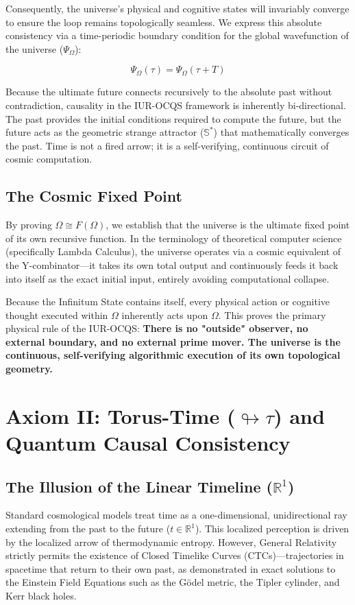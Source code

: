 \documentclass[12pt,openany]{book}
\begin{document}
Consequently, the universe's physical and cognitive states will invariably converge to ensure the loop remains topologically seamless. We express this absolute consistency via a time-periodic boundary condition for the global wavefunction of the universe ($\Psi_\Omega$):

\begin{equation}
\Psi_\Omega(\tau) = \Psi_\Omega(\tau + T)
\end{equation}

Because the ultimate future connects recursively to the absolute past without contradiction, causality in the IUR-OCQS framework is inherently bi-directional. The past provides the initial conditions required to compute the future, but the future acts as the geometric strange attractor ($\mathbb{S}^*$) that mathematically converges the past. Time is not a fired arrow; it is a self-verifying, continuous circuit of cosmic computation.

\subsection{The Cosmic Fixed Point}
By proving $\Omega \cong F(\Omega)$, we establish that the universe is the ultimate fixed point of its own recursive function. In the terminology of theoretical computer science (specifically Lambda Calculus), the universe operates via a cosmic equivalent of the Y-combinator—it takes its own total output and continuously feeds it back into itself as the exact initial input, entirely avoiding computational collapse.

Because the Infinitum State contains itself, every physical action or cognitive thought executed within $\Omega$ inherently acts upon $\Omega$. This proves the primary physical rule of the IUR-OCQS: \textbf{There is no "outside" observer, no external boundary, and no external prime mover. The universe is the continuous, self-verifying algorithmic execution of its own topological geometry.}

\section[Axiom II]{Axiom II: Torus-Time ($\looparrowright\tau$) and Quantum Causal Consistency}

\subsection{The Illusion of the Linear Timeline ($\mathbb{R}^1$)}
Standard cosmological models treat time as a one-dimensional, unidirectional ray extending from the past to the future ($t \in \mathbb{R}^1$). This localized perception is driven by the localized arrow of thermodynamic entropy. However, General Relativity strictly permits the existence of Closed Timelike Curves (CTCs)—trajectories in spacetime that return to their own past, as demonstrated in exact solutions to the Einstein Field Equations such as the Gödel metric, the Tipler cylinder, and Kerr black holes.
\end{document}
